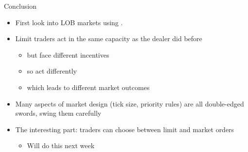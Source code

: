 \documentclass[english,10pt
,aspectratio=169
]{beamer}
\begin{document}


\begin{frame}{Conclusion}
	\begin{itemize}
		\item First look into LOB markets using \cite{glosten_is_1994}.
		\item Limit traders act in the same capacity as the dealer did before
		\begin{itemize}
			\item but face different incentives
			\item so act differently
			\item which leads to different market outcomes
		\end{itemize}
		\item Many aspects of market design (tick size, priority rules) are all double-edged swords, swing them carefully
		\item The interesting part: traders can choose between limit and market orders
		\begin{itemize}
			\item Will do this next week
		\end{itemize}
	\end{itemize}
\end{frame}
\end{document}
